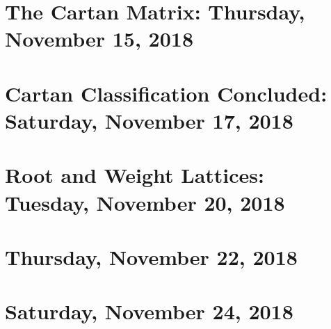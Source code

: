 \documentclass[reqno]{amsart}
\begin{document}
\section{The Cartan Matrix: Thursday, November 15, 2018}
    
\section{Cartan Classification Concluded: Saturday, November 17, 2018}
    
\section{Root and Weight Lattices: Tuesday, November 20, 2018}
    
\section{Thursday, November 22, 2018}
    
\section{Saturday, November 24, 2018}
    
\end{document}
